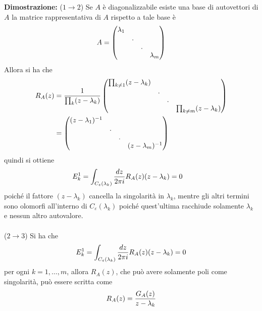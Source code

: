 \documentclass{article}
\begin{document}
\textbf{Dimostrazione:} ($1 \rightarrow 2$) Se $A$ è diagonalizzabile esiste una base di autovettori di $A$ la matrice rappresentativa di $A$ rispetto a tale base è
\begin{gather}
    A = \begin{pmatrix}
        \lambda_1 & & & \\
         & . & & \\
         & & . & \\
         & & & \lambda_m
    \end{pmatrix} \notag
\end{gather}
Allora si ha che
\begin{align}
    R_A(z) &= \frac{1}{\prod_k(z - \lambda_k)}\begin{pmatrix}
        \prod_{k \neq 1}(z - \lambda_k) & & & \\
        & . & & \\
        & & . & \\
        & & & \prod_{k \neq m}(z - \lambda_k)
    \end{pmatrix} \notag \\
    &= \begin{pmatrix}
        (z - \lambda_1)^{-1} & & & \\
        & . & & \\
        & & . & \\
        & & & (z - \lambda_m)^{-1}
    \end{pmatrix} \notag
\end{align}
quindi si ottiene
\begin{align}
    E_k^1 &= \int_{C_\varepsilon(\lambda_k)}\frac{dz}{2\pi i}R_A(z)(z - \lambda_k) \notag = 0 \notag
\end{align}
poiché il fattore $(z - \lambda_k)$ cancella la singolarità in $\lambda_k$, mentre gli altri termini sono olomorfi all'interno di $C_\varepsilon(\lambda_k)$ poiché quest'ultima racchiude solamente $\lambda_k$ e nessun altro autovalore. \\ \\
($2 \rightarrow 3$) Si ha che
\begin{gather}
    E_k^1 = \int_{C_\varepsilon(\lambda_k)}\frac{dz}{2\pi i}R_A(z)(z - \lambda_k) = 0 \notag
\end{gather}
per ogni $k = 1, \dots, m$, allora $R_A(z)$, che può avere solamente poli come singolarità, può essere scritta come
\begin{gather}
    R_A(z) = \frac{G_A(z)}{z - \lambda_k} \notag
\end{gather}
\end{document}
